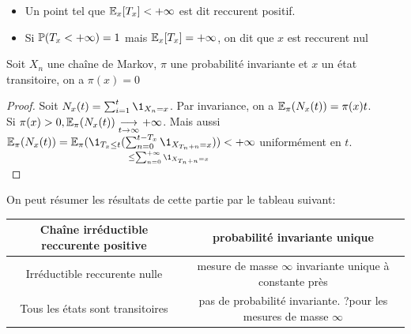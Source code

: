 \documentclass[]{report}
\begin{document}
    \begin{df}{}{}
        \begin{itemize}
            \item Un point tel que $\mathbb{E}_x[T_x]<+\infty$ est dit reccurent positif.
            \item Si $\mathbb{P}(T_x<+\infty)=1$ mais $\mathbb{E}_x[T_x]=+\infty$, on dit que $x$ est reccurent nul
        \end{itemize}
    \end{df}

    \begin{prop}{}{}
        Soit $X_n$ une chaîne de Markov, $\pi$ une probabilité invariante et $x$ un état transitoire, on a $\pi(x)=0$
    \end{prop}

    \begin{proof}
        Soit $N_x(t)=\sum_{i=1}^{t}\1_{X_n=x}$. Par invariance, on a $\mathbb{E}_{\pi}(N_x(t))=\pi(x)t$.\\
        Si $\pi(x)>0,\mathbb{E}_{\pi}(N_x(t))\underset{t\to \infty}{\longrightarrow}+\infty$. Mais aussi $\Ea_\pi(N_x(t))=\Ea_\pi(\1_{T_x\le t}(\underset{\le\sum_{n=0}^{+\infty}\1_{X_{T_n+n}=x}}{\sum_{n=0}^{t-T_x}\1_{X_{T_n+n}=x}}))<+\infty$ uniformément en $t$.\\
    \end{proof}

    On peut résumer les résultats de cette partie par le tableau suivant:\vspace{0.5cm} \\ 
        \begin{tabular}{|c|c|}
            \hline
            Chaîne irréductible reccurente positive & probabilité invariante unique\\
            \hline
            Irréductible reccurente nulle & mesure de masse $\infty$ invariante unique à constante près\\
            \hline
            Tous les états sont transitoires & pas de probabilité invariante. ?pour les mesures de masse $\infty$\\
            \hline
        \end{tabular}
\end{document}
